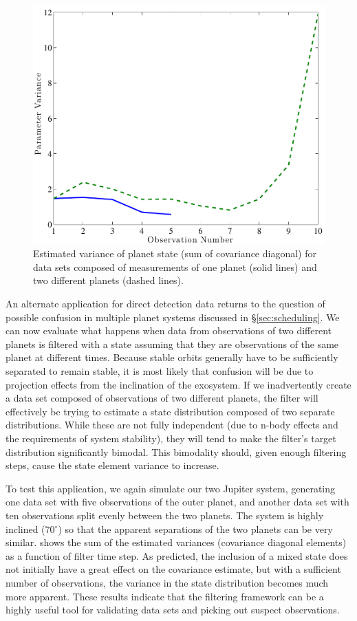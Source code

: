  \begin{figure}[ht]
 \begin{center}
    \includegraphics[width=4.5in]{./figures/estVariance}
 \end{center}
\caption[State variance estimates for confused data set]{Estimated variance of planet state (sum of covariance diagonal) for data sets composed of measurements of one planet (solid lines) and two different planets (dashed lines). \label{fig:estVars}}
\end{figure}

An alternate application for direct detection data returns to the question of possible confusion in multiple planet systems discussed in \S\ref{sec:scheduling}.  We can now evaluate what happens when data from observations of two different planets is filtered with a state assuming that they are observations of the same planet at different times.   Because stable orbits generally have to be sufficiently separated to remain stable, it is most likely that confusion will be due to projection effects from the inclination of the exosystem.  If we inadvertently create a data set composed of observations of two different planets, the filter will effectively be trying to estimate a state distribution composed of two separate distributions.  While these are not fully independent (due to n-body effects and the requirements of system stability), they will tend to make the filter's target distribution significantly bimodal.  This bimodality should, given enough filtering steps, cause the state element variance to increase.

To test this application, we again simulate our two Jupiter system, generating one data set with five observations of the outer planet, and another data set with ten observations split evenly between the two planets.  The system is highly inclined (70$^\circ$) so that the apparent separations of the two planets can be very similar.   shows the sum of the estimated variances (covariance diagonal elements) as a function of filter time step.  As predicted, the inclusion of a mixed state does not initially have a great effect on the covariance estimate, but with a sufficient number of observations, the variance in the state distribution becomes much more apparent.  These results indicate that the filtering framework can be a highly useful tool for validating data sets and picking out suspect observations.

